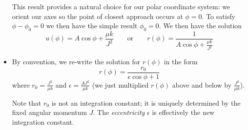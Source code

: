 \documentclass[11pt, a4paper]{article}
\newcommand{\eqtext}[1]{\qquad \text{#1} \qquad}
\begin{document}
\begin{itemize}
	This result provides a natural choice for our polar coordinate system: we orient our axes so the point of closest approach occurs at $ \phi = 0 $. To satisfy $ \phi - \phi_{0} = 0$ we then have the simple result $ \phi_{0} = 0$. We then have the solution
	\begin{equation*}
		u(\phi) = A \cos \phi + \frac{\mu k}{J^{2}} \eqtext{or} r(\phi) = \frac{1}{A \cos \phi + \frac{\mu k}{J^{2}}}
	\end{equation*}
	
	\item By convention, we re-write the solution for $ r(\phi) $ in the form
	\begin{equation*}
		r(\phi) = \frac{r_{0}}{\epsilon \cos \phi + 1}
	\end{equation*}
	where $ r_{0} = \frac{J^{2}}{\mu k} $ and $ \epsilon = \frac{AJ^{2}}{\mu k} $ (we just multiplied $ r(\phi) $ above and below by $ \frac{J^{2}}{\mu k} $).
	
	Note that $ r_{0} $ is not an integration constant; it is uniquely determined by the fixed angular momentum $ J $. The \textit{eccentricity} $\epsilon$ is effectively the new integration constant.

\end{itemize}
\end{document}
